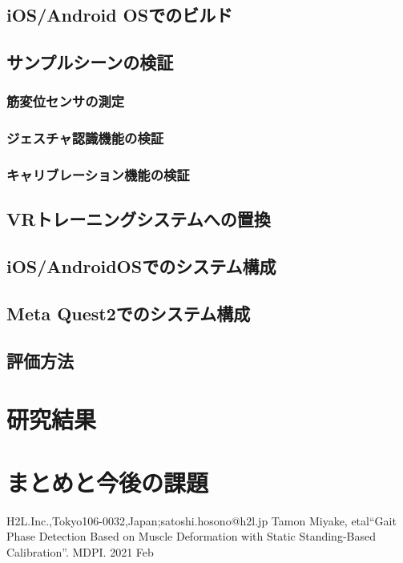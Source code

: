 \documentclass{ltjsarticle}
\begin{document}
	\subsection{iOS/Android OSでのビルド}
		
	\subsection{サンプルシーンの検証}
	\subsubsection{筋変位センサの測定}
	\subsubsection{ジェスチャ認識機能の検証}
	\subsubsection{キャリブレーション機能の検証}
	\subsection{VRトレーニングシステムへの置換}
	\subsection{iOS/AndroidOSでのシステム構成}
	\subsection{Meta Quest2でのシステム構成}
	\subsection{評価方法}

\section{研究結果}
\section{まとめと今後の課題}

\begin{thebibliography}{99}%
	\begin{spacing}{0.8}

			H2L.Inc.,Tokyo106-0032,Japan;satoshi.hosono@h2l.jp
			Tamon Miyake, etal``Gait Phase Detection Based on Muscle Deformation
			with Static Standing-Based Calibration''.
			MDPI. 2021 Feb

	\end{spacing}
\end{thebibliography}
\end{document}
